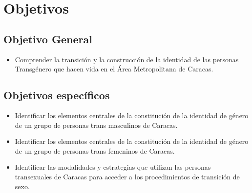 	

\section{Objetivos}


\subsection{Objetivo General}
	\begin{itemize}
		\item Comprender la transición y la construcción de la identidad de las
		personas Transgénero que hacen vida en el Área Metropolitana de Caracas.
	\end{itemize}

\subsection{Objetivos específicos}
	\begin{itemize}
		\item Identificar los elementos centrales de la constitución de la identidad
	de género de un grupo de personas trans masculinos de Caracas.
		\item Identificar los elementos centrales de la constitución de la identidad
	de género de un grupo de personas trans femeninos de Caracas.
		\item Identificar las modalidades y estrategias que utilizan las personas
	transexuales de Caracas para acceder a los procedimientos de transición de sexo.
	\end{itemize}